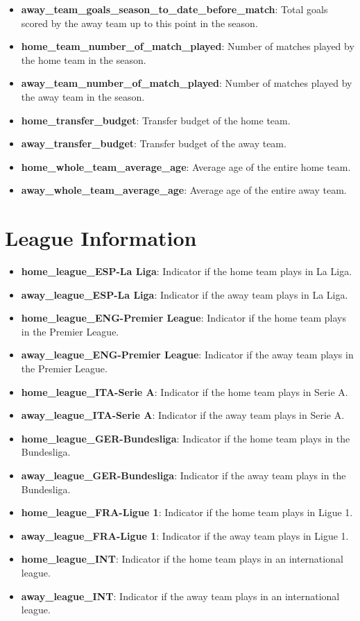 \begin{itemize}
    \item \textbf{away\_team\_goals\_season\_to\_date\_before\_match}: Total goals scored by the away team up to this point in the season.
    \item \textbf{home\_team\_number\_of\_match\_played}: Number of matches played by the home team in the season.
    \item \textbf{away\_team\_number\_of\_match\_played}: Number of matches played by the away team in the season.
    \item \textbf{home\_transfer\_budget}: Transfer budget of the home team.
    \item \textbf{away\_transfer\_budget}: Transfer budget of the away team.
    \item \textbf{home\_whole\_team\_average\_age}: Average age of the entire home team.
    \item \textbf{away\_whole\_team\_average\_age}: Average age of the entire away team.
\end{itemize}

\section{League Information}
\begin{itemize}
    \item \textbf{home\_league\_ESP-La Liga}: Indicator if the home team plays in La Liga.
    \item \textbf{away\_league\_ESP-La Liga}: Indicator if the away team plays in La Liga.
    \item \textbf{home\_league\_ENG-Premier League}: Indicator if the home team plays in the Premier League.
    \item \textbf{away\_league\_ENG-Premier League}: Indicator if the away team plays in the Premier League.
    \item \textbf{home\_league\_ITA-Serie A}: Indicator if the home team plays in Serie A.
    \item \textbf{away\_league\_ITA-Serie A}: Indicator if the away team plays in Serie A.
    \item \textbf{home\_league\_GER-Bundesliga}: Indicator if the home team plays in the Bundesliga.
    \item \textbf{away\_league\_GER-Bundesliga}: Indicator if the away team plays in the Bundesliga.
    \item \textbf{home\_league\_FRA-Ligue 1}: Indicator if the home team plays in Ligue 1.
    \item \textbf{away\_league\_FRA-Ligue 1}: Indicator if the away team plays in Ligue 1.
    \item \textbf{home\_league\_INT}: Indicator if the home team plays in an international league.
    \item \textbf{away\_league\_INT}: Indicator if the away team plays in an international league.
\end{itemize}


